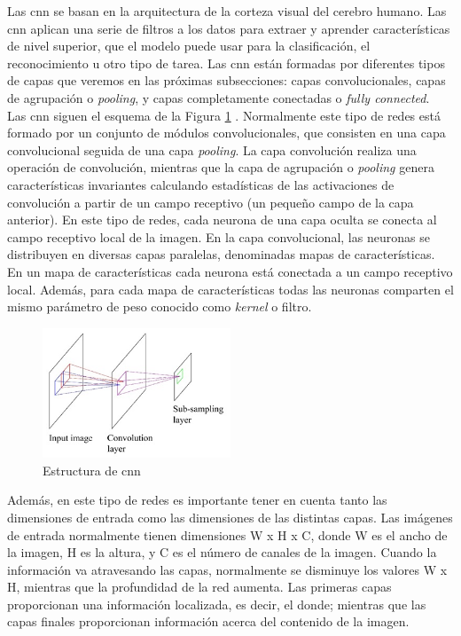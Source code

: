 Las \acrshort{cnn} se basan en la arquitectura de la corteza visual del cerebro humano. Las \acrshort{cnn} aplican una serie de filtros a los datos para extraer y aprender características de nivel superior, que el modelo puede usar para la clasificación, el reconocimiento u otro tipo de tarea. Las \acrshort{cnn} están formadas por diferentes tipos de capas que veremos en las próximas subsecciones: capas convolucionales, capas de agrupación o \textit{pooling}, y capas completamente conectadas o \textit{fully connected}. \\

Las \acrshort{cnn} siguen el esquema de la Figura \ref{fig.arquitectura_cnn} \cite{rna8}. Normalmente este tipo de redes está formado por un conjunto de módulos convolucionales, que consisten en una capa convolucional seguida de una capa \textit{pooling}. La capa convolución realiza una operación de convolución, mientras que la capa de agrupación o \textit{pooling} genera características invariantes calculando estadísticas de las activaciones de convolución a partir de un campo receptivo (un pequeño campo de la capa anterior). En este tipo de redes, cada neurona de una capa oculta se conecta al campo receptivo local de la imagen. En la capa convolucional, las neuronas se distribuyen en diversas capas paralelas, denominadas mapas de características. En un mapa de características cada neurona está conectada a un campo receptivo local. Además, para cada mapa de características todas las neuronas comparten el mismo parámetro de peso conocido como \textit{kernel} o filtro.\\


\begin{figure}[H]
  \begin{center}
    \includegraphics[width=0.5\textwidth]{figures/Introduccion/arquitectura_cnn.png}
		\caption{Estructura de \acrshort{cnn}}
		\label{fig.arquitectura_cnn}
		\end{center}
\end{figure}

Además, en este tipo de redes es importante tener en cuenta tanto las dimensiones de entrada como las dimensiones de las distintas capas. Las imágenes de entrada normalmente tienen dimensiones W x H x C, donde W es el ancho de la imagen, H es la altura, y C es el número de canales de la imagen. Cuando la información va atravesando las capas, normalmente se disminuye los valores W x H, mientras que la profundidad de la red aumenta. Las primeras capas proporcionan una información localizada, es decir, el donde; mientras que las capas finales proporcionan información acerca del contenido de la imagen.



